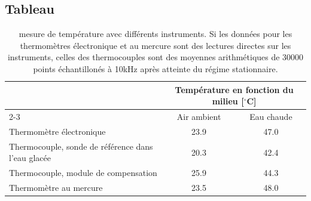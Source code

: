 \documentclass[11pt,twoside]{article}
\numberwithin{figure}{section}
\begin{document}
\subsection{Tableau}
\begin{table}[h]
    \centering
    \caption{mesure de température avec différents instruments. Si les données pour les thermomètres électronique et au mercure sont des lectures directes sur les instruments, celles des thermocouples sont des moyennes arithmétiques de 30000 points échantillonés à 10kHz après atteinte du régime stationnaire.}
    \label{tab:Perf_TC}
    \begin{tabular}{|l|c|c|}
        \hline
        & \multicolumn{2}{c|}{Température en fonction du milieu [\(^\circ\)C]} \\ \cline{2-3}
        & Air ambient & Eau chaude \\ \hline
        Thermomètre électronique & 23.9 & 47.0 \\ \hline
        Thermocouple, sonde de référence dans l'eau glacée & 20.3 & 42.4 \\ \hline
        Thermocouple, module de compensation & 25.9 & 44.3 \\ \hline
        Thermomètre au mercure & 23.5 & 48.0 \\ \hline
    \end{tabular}
\end{table}
\end{document}
